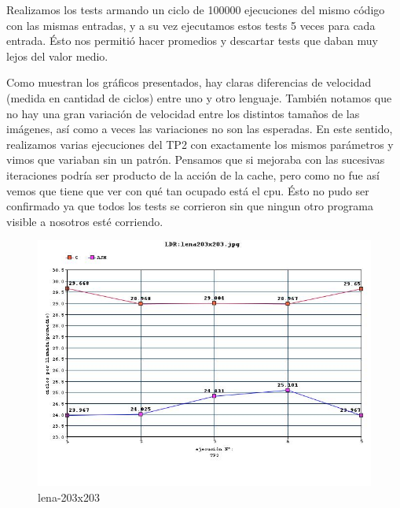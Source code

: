 Realizamos los tests armando un ciclo de 100000 ejecuciones del mismo c\'odigo con las mismas entradas, y a su vez ejecutamos estos tests 5 veces para cada entrada. \'Esto nos 
permiti\'o hacer promedios y descartar tests que daban muy lejos del valor medio.

Como muestran los gr\'aficos presentados, hay claras diferencias de velocidad (medida en cantidad de ciclos) entre uno y otro lenguaje. Tambi\'en notamos que no hay una gran 
variaci\'on de velocidad entre los distintos tamaños de las im\'agenes, as\'i como a veces las variaciones no son las esperadas. En este sentido, realizamos varias ejecuciones 
del TP2 con exactamente los mismos par\'ametros y vimos que variaban sin un patr\'on. Pensamos que si mejoraba con las sucesivas iteraciones podr\'ia ser 
producto de la acci\'on de la cache, pero como no fue as\'i vemos que tiene que ver con qu\'e tan ocupado est\'a el cpu. \'Esto no pudo ser confirmado ya que todos 
los tests se corrieron sin que ningun otro programa visible a nosotros est\'e corriendo.
\begin{figure}
  \begin{center}
	\includegraphics[scale=0.66]{imagenes/ldr-lena-203.jpg}
	\caption{lena-203x203}
	\label{lena-203x203}
  \end{center}
\end{figure}
